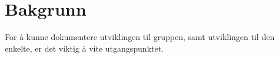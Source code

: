 \chapter{Bakgrunn}
For å kunne dokumentere utviklingen til gruppen, samt utviklingen til den enkelte, er det viktig å vite utgangspunktet.


